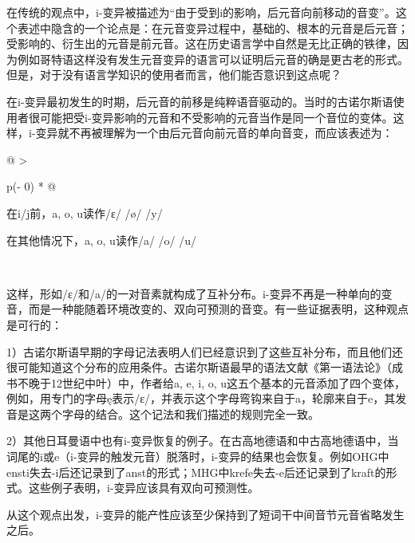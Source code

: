 在传统的观点中，i-变异被描述为``由于受到i的影响，后元音向前移动的音变''。这个表述中隐含的一个论点是：在元音变异过程中，基础的、根本的元音是后元音；受影响的、衍生出的元音是前元音。这在历史语言学中自然是无比正确的铁律，因为例如哥特语这样没有发生元音变异的语言可以证明后元音的确是更古老的形式。但是，对于没有语言学知识的使用者而言，他们能否意识到这点呢？

在i-变异最初发生的时期，后元音的前移是纯粹语音驱动的。当时的古诺尔斯语使用者很可能把受i-变异影响的元音和不受影响的元音当作是同一个音位的变体。这样，i-变异就不再被理解为一个由后元音向前元音的单向音变，而应该表述为：

\begin{longtable}[]{@{}
  >{\raggedright\arraybackslash}p{(\columnwidth - 0\tabcolsep) * }@{}}
\toprule\noalign{}
\begin{minipage}[b]{\linewidth}\raggedright
在i/j前，a, o, u读作/ɛ/ /ø/ /y/

在其他情况下，a, o, u读作/a/ /o/ /u/
\end{minipage} \\
\midrule\noalign{}
\endhead
\bottomrule\noalign{}
\endlastfoot
\end{longtable}

这样，形如/ɛ/和/a/的一对音素就构成了互补分布。i-变异不再是一种单向的变音，而是一种能随着环境改变的、双向可预测的音变。有一些证据表明，这种观点是可行的：

1）古诺尔斯语早期的字母记法表明人们已经意识到了这些互补分布，而且他们还很可能知道这个分布的应用条件。古诺尔斯语最早的语法文献《第一语法论》（成书不晚于12世纪中叶）中，作者给a,
e, i, o,
u这五个基本的元音添加了四个变体，例如，用专门的字母ę表示/ɛ/，并表示这个字母弯钩来自于a，轮廓来自于e，其发音是这两个字母的结合。这个记法和我们描述的规则完全一致。

2）其他日耳曼语中也有i-变异恢复的例子。在古高地德语和中古高地德语中，当词尾的i或e（i-变异的触发元音）脱落时，i-变异的结果也会恢复。例如OHG中ensti失去-i后还记录到了anst的形式；MHG中krefe失去-e后还记录到了kraft的形式。这些例子表明，i-变异应该具有双向可预测性。

从这个观点出发，i-变异的能产性应该至少保持到了短词干中间音节元音省略发生之后。

